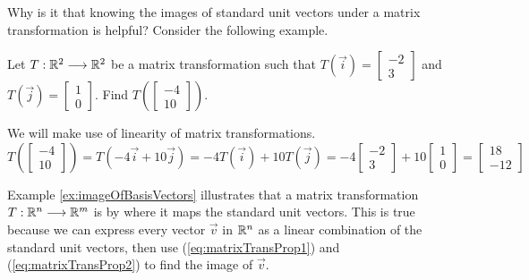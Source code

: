 \documentclass{ximera}
\begin{document}
Why is it that knowing the images of standard unit vectors under a matrix transformation is helpful?  Consider the following example.

\begin{example}\label{ex:imageOfBasisVectors}
    Let $T:\mathbb{R}^2\longrightarrow\mathbb{R}^2$ be a matrix transformation such that  $T(\vec{i})=\begin{bmatrix}-2\\3\end{bmatrix}$ and $T(\vec{j})=\begin{bmatrix}1\\0\end{bmatrix}$.  Find $T\left(\begin{bmatrix}-4\\10\end{bmatrix}\right)$. 
    \begin{explanation}
        We will make use of linearity of matrix transformations.   $$T\left(\begin{bmatrix}-4\\10\end{bmatrix}\right)=T(-4\vec{i}+10\vec{j})=-4T(\vec{i})+10T(\vec{j})=-4\begin{bmatrix}-2\\3\end{bmatrix}+10\begin{bmatrix}1\\0\end{bmatrix}=\begin{bmatrix}18\\-12\end{bmatrix}$$
    \end{explanation}
\end{example}

Example \ref{ex:imageOfBasisVectors} illustrates that a matrix transformation $T:\mathbb{R}^n\longrightarrow\mathbb{R}^m$ is  by where it maps the standard unit vectors.  This is true because we can express every vector $\vec{v}$ in $\mathbb{R}^n$ as a linear combination of the standard unit vectors, then use (\ref{eq:matrixTransProp1}) and (\ref{eq:matrixTransProp2}) to find the image of $\vec{v}$.  %
\end{document}
